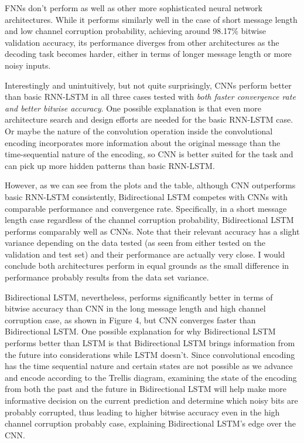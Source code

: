 \documentclass[10pt,twocolumn,letterpaper]{article}
\begin{document}
FNNs don't perform as well as other more sophisticated neural network architectures. While it performs similarly well in the case of short message length and low channel corruption probability, achieving around 98.17\% bitwise validation accuracy, its performance diverges from other architectures as the decoding task becomes harder, either in terms of longer message length or more noisy inputs.

Interestingly and unintuitively, but not quite surprisingly, CNNs perform better than basic RNN-LSTM in all three cases tested with \textit{both faster convergence rate and better bitwise accuracy}. One possible explanation is that even more architecture search and design efforts are needed for the basic RNN-LSTM case. Or maybe the nature of the convolution operation inside the convolutional encoding incorporates more information about the original message than the time-sequential nature of the encoding, so CNN is better suited for the task and can pick up more hidden patterns than basic RNN-LSTM.

However, as we can see from the plots and the table, although CNN outperforms basic RNN-LSTM consistently, Bidirectional LSTM competes with CNNs with comparable performance and convergence rate. Specifically, in a short message length case regardless of the channel corruption probability, Bidirectional LSTM performs comparably well as CNNs. Note that their relevant accuracy has a slight variance depending on the data tested (as seen from either tested on the validation and test set) and their performance are actually very close. I would conclude both architectures perform in equal grounds as the small difference in performance probably results from the data set variance. 

Bidirectional LSTM, nevertheless, performs significantly better in terms of bitwise accuracy than CNN in the long message length and high channel corruption case, as shown in Figure 4, but CNN converges faster than Bidirectional LSTM. One possible explanation for why Bidirectional LSTM performs better than LSTM is that Bidirectional LSTM brings information from the future into considerations while LSTM doesn't. Since convolutional encoding has the time sequential nature and certain states are not possible as we advance and encode according to the Trellis diagram, examining the state of the encoding from both the past and the future in Bidirectional LSTM will help make more informative decision on the current prediction and determine which noisy bits are probably corrupted, thus leading to higher bitwise accuracy even in the high channel corruption probably case, explaining Bidirectional LSTM's edge over the CNN.
\end{document}
